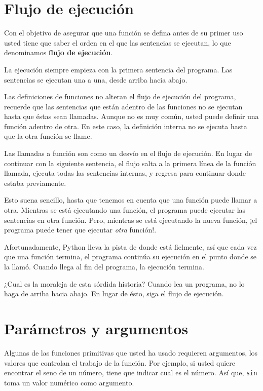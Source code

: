 \section{Flujo de ejecución}


Con el objetivo de asegurar que una función se defina antes de su
primer uso usted tiene que saber el orden en el que las sentencias
se ejecutan, lo que denominamos \textbf{flujo de ejecución}.

La ejecución siempre empieza con la primera sentencia del programa.
Las sentencias se ejecutan una a una, desde arriba hacia abajo.

Las definiciones de funciones no alteran el flujo de ejecución del
programa, recuerde que las sentencias que están adentro de las funciones
no se ejecutan hasta que éstas sean llamadas. Aunque no es muy común,
usted puede definir una función adentro de otra. En este caso, la
definición interna no se ejecuta hasta que la otra función se llame.

Las llamadas a función son como un desvío en el flujo de ejecución.
En lugar de continuar con la siguiente sentencia, el flujo salta a
la primera línea de la función llamada, ejecuta todas las sentencias
internas, y regresa para continuar donde estaba previamente.

Esto suena sencillo, hasta que tenemos en cuenta que una función puede
llamar a otra. Mientras se está ejecutando una función, el programa
puede ejecutar las sentencias en otra función. Pero, mientras se está
ejecutando la nueva función, ¡el programa puede tener que ejecutar
\textit{otra} función!.

Afortunadamente, Python lleva la pista de donde está fielmente, así
que cada vez que una función termina, el programa continúa su ejecución
en el punto donde se la llamó. Cuando llega al fin del programa, la
ejecución termina.

¿Cual es la moraleja de esta sórdida historia? Cuando lea un programa,
no lo haga de arriba hacia abajo. En lugar de ésto, siga el flujo
de ejecución.

\section{Parámetros y argumentos}

\label{parameters}  
 

Algunas de las funciones primitivas que usted ha usado requieren argumentos,
los valores que controlan el trabajo de la función. Por ejemplo, si
usted quiere encontrar el seno de un número, tiene que indicar cual
es el número. Así que, \texttt{sin} toma un valor numérico como argumento.

